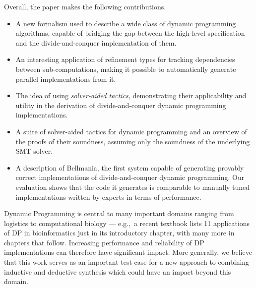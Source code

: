 Overall, the paper makes the following contributions. 
\begin{itemize}
\item A new formalism used to describe a wide class of dynamic programming algorithms, capable of bridging the gap between the high-level specification and the divide-and-conquer implementation of them.

\item An interesting application of refinement types for tracking dependencies between sub-computations, making it possible to automatically generate parallel implementations from it.

\item The idea of using \emph{solver-aided tactics}, demonstrating their applicability and utility in the derivation of divide-and-conquer dynamic programming implementations. 

\item A suite of solver-aided tactics for dynamic programming and an overview of the proofs of their soundness, assuming only the soundness of the underlying SMT solver. 

\item A description of Bellmania, the first system capable of generating provably correct implementations of di\-vide-and-conquer dynamic programming. Our evaluation shows that the code it generates is comparable to manually tuned implementations written by experts in terms of performance.
\end{itemize}

Dynamic Programming is central to many important domains ranging from logistics to computational biology --- e.g.,~a recent textbook \cite{DurbinEdKr98} lists 11 applications of DP in bioinformatics just in its introductory chapter, with many more in chapters that follow. Increasing performance and reliability of DP implementations can therefore have significant impact. More generally, we believe that this work serves as an important test case for a new approach to combining inductive and deductive synthesis which could have an impact beyond this domain. 








